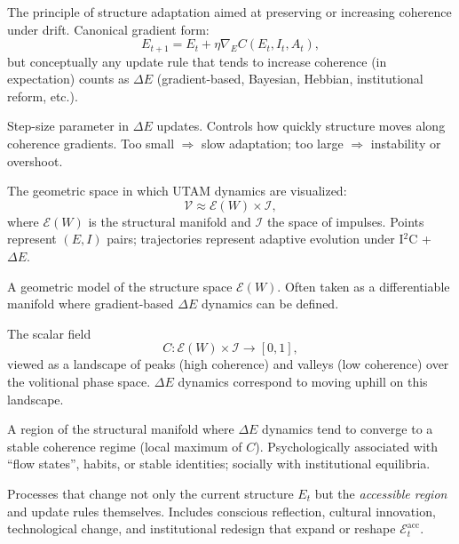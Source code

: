 \documentclass[12pt,a4paper]{report}
\newcommand{\Will}{W}
\begin{document}
\begin{description}[leftmargin=2.5cm,style=nextline]
    \item[\(\Delta E\) (\textbf{Delta-E} update)] 
    The principle of structure adaptation aimed at preserving or increasing coherence under drift. Canonical gradient form:
    \[
        E_{t+1} = E_t + \eta \nabla_E C(E_t, I_t, A_t),
    \]
    but conceptually any update rule that tends to increase coherence (in expectation) counts as $\Delta E$ (gradient-based, Bayesian, Hebbian, institutional reform, etc.).

    \item[\(\eta\) (Learning rate / adaptation speed)] 
    Step-size parameter in $\Delta E$ updates. Controls how quickly structure moves along coherence gradients. Too small $\Rightarrow$ slow adaptation; too large $\Rightarrow$ instability or overshoot.

    \item[\textbf{Volitional phase space}] 
    The geometric space in which UTAM dynamics are visualized:
    \[
        \mathcal{V} \approx \mathcal{E}(\Will) \times \mathcal{I},
    \]
    where \(\mathcal{E}(\Will)\) is the structural manifold and \(\mathcal{I}\) the space of impulses. Points represent \((E, I)\) pairs; trajectories represent adaptive evolution under I$^2$C + $\Delta E$.

    \item[\textbf{Structural manifold} (\(\mathcal{M}\))] 
    A geometric model of the structure space \(\mathcal{E}(\Will)\). Often taken as a differentiable manifold where gradient-based $\Delta E$ dynamics can be defined.

    \item[\textbf{Coherence landscape}] 
    The scalar field
    \[
        C : \mathcal{E}(\Will) \times \mathcal{I} \to [0,1],
    \]
    viewed as a landscape of peaks (high coherence) and valleys (low coherence) over the volitional phase space. $\Delta E$ dynamics correspond to moving uphill on this landscape.

    \item[\textbf{Attractor basin}] 
    A region of the structural manifold where $\Delta E$ dynamics tend to converge to a stable coherence regime (local maximum of \(C\)). Psychologically associated with ``flow states'', habits, or stable identities; socially with institutional equilibria.

    \item[\textbf{Meta-structural dynamics}] 
    Processes that change not only the current structure \(E_t\) but the \emph{accessible region} and update rules themselves. Includes conscious reflection, cultural innovation, technological change, and institutional redesign that expand or reshape \(\mathcal{E}_t^{\mathrm{acc}}\).


\end{description}
\end{document}
